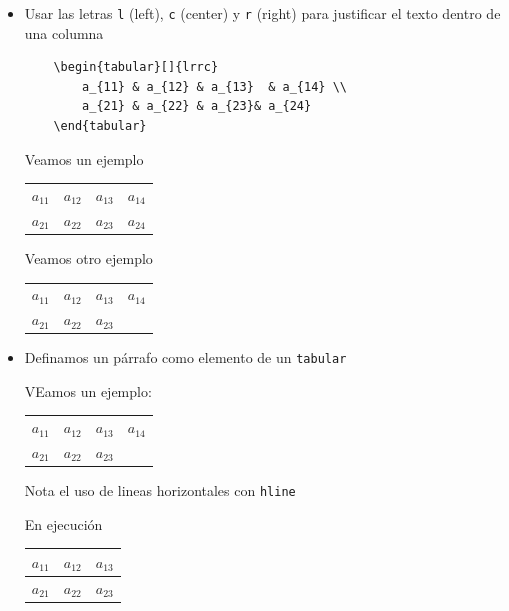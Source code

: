 \documentclass[]{article}
\begin{document}
\begin{itemize}
	\item Usar las letras \verb*|l| (left), \verb*|c| (center) y \verb*|r| (right) para justificar el texto dentro de una columna
\begin{verbatim}
	\begin{tabular}[]{lrrc}
		a_{11} & a_{12} & a_{13}  & a_{14} \\
		a_{21} & a_{22} & a_{23}& a_{24}
	\end{tabular}
\end{verbatim}	

Veamos un ejemplo
	\begin{tabular}[]{lrrc}
	$a_{11}$ & $a_{12}$ & $a_{13}$  & $a_{14}$ \\
	$a_{21}$ & $a_{22}$ & $a_{23}$& $a_{24}$
\end{tabular}


	Veamos otro ejemplo
	\begin{tabular}[]{lrrc}
		$a_{11}$ & $a_{12}$ & $a_{13}$  & $a_{14}$ \\
		$a_{21}$ & $a_{22}$ & $a_{23}$& \lipsum[2]
	\end{tabular}
\item Definamos un párrafo como elemento de un \verb*|tabular|

VEamos un ejemplo:


	\begin{tabular}[]{lrrp{9cm}}   %
	$a_{11}$ & $a_{12}$ & $a_{13}$  & $a_{14}$ \\
	$a_{21}$ & $a_{22}$ & $a_{23}$& \lipsum[2]
\end{tabular}

Nota el uso de lineas horizontales con \verb*|hline|


En ejecución
\begin{center}
	\begin{tabular}[]{|c|c|c|}
	\hline 
		$a_{11}$ & $a_{12}$ & $a_{13}$  \\
	\hline	
		$a_{21}$ & $a_{22}$ & $a_{23}$  \\
	\hline
	\end{tabular}
\end{center}




\end{itemize}
\end{document}
